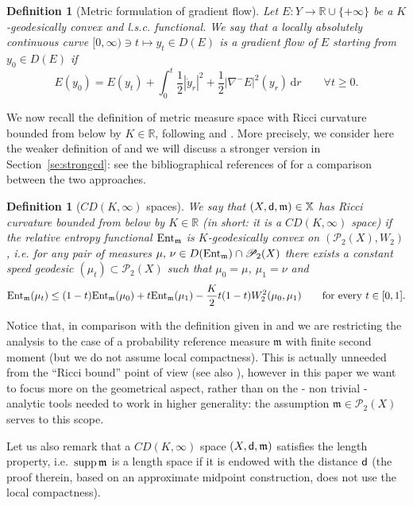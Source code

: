 \documentclass[reqno,11pt]{article}
\numberwithin{equation}{section}
\newcommand{\R}{\mathbb{R}}
\newcommand{\mm}{{\mbox{\boldmath$m$}}}
\newcommand{\sfd}{{\sf d}}
\newcommand{\supp}{\mathop{\rm supp}\nolimits}   %
\renewcommand{\d}{{\mathrm d}}
\newcommand{\forevery}{\text{for every }}
\newcommand{\ProbabilitiesTwo}[1]{\mathscr P_2(#1)}     %
\newtheorem{definition}[theorem]{Definition}
\newcommand{\entv}{{\rm Ent}_{\mm}}                    %
\newcommand{\probt}{\ProbabilitiesTwo}
\newcommand{\X}{\mathbb X}
\newcommand{\entr}[2]{{\rm Ent}_{#2}(#1)}              %
\renewcommand{\mm}{\mathfrak m}
\begin{document}
\begin{definition}[Metric  formulation of gradient flow]\label{def:dissKconv}
Let $E:Y\to\R\cup\{+\infty\}$ be a $K$-geodesically convex and
l.s.c. functional. We say that a locally absolutely continuous curve
$[0,\infty)\ni t\mapsto y_t\in D(E)$ is a gradient flow of $E$
starting from $y_0\in D(E)$ if
\begin{equation}\label{eq:ede}
E(y_0)= E(y_t)+\int_0^t\frac12 |\dot y_r|^2+\frac12|\nabla^-
E|^2(y_r)\,\d r\qquad\forall t\geq 0.
\end{equation}
\end{definition}
%
We now recall the definition of metric measure space with Ricci
curvature bounded from below by $K\in\R$, following \cite[\S
4.2]{Sturm06I} and \cite[\S 5]{Lott-Villani09}. More precisely, we
consider here the weaker definition of \cite{Sturm06I} and we will
discuss a stronger version in Section~\ref{se:strongcd}: see the
bibliographical references of \cite[Chapter 17]{Villani09} for a
comparison between the two approaches.
%
\begin{definition}[$CD(K,\infty)$ spaces]\label{def:cdk}
We say that $(X,\sfd,\mm)\in\X$ has Ricci curvature bounded from
below by $K\in\R$ (in short: it is a $CD(K,\infty)$ space) if the
relative entropy functional $\entv$ is $K$-geodesically convex on
$(\probt X,W_2)$, i.e. for any pair of measures $\mu,\,\nu\in
D(\entv)\cap\probt X$ there exists a constant speed geodesic
$(\mu_t)\subset\probt X$ such that $\mu_0=\mu$, $\mu_1=\nu$ and
\[
\entr{\mu_t}\mm\leq(1-t)\entr{\mu_0}\mm+t\entr{\mu_1}\mm-\frac
K2t(1-t)W_2^2(\mu_0,\mu_1)\qquad\forevery t\in[0,1].
\]
\end{definition}
%
Notice that, in comparison with the definition given in
\cite{Sturm06I} and \cite{Lott-Villani09} we are restricting the
analysis to the case of a probability reference measure  $\mm$ with
finite second moment (but we do not assume local compactness). This
is actually unneeded from the ``Ricci bound'' point of view (see
also \cite[Definition~9.1]{Ambrosio-Gigli-Savare11}), however in
this paper we want to focus more on the geometrical aspect, rather
than on the - non trivial - analytic tools needed to work in higher
generality: the assumption $\mm\in\probt X$ serves to this scope.

Let us also remark that a $CD(K,\infty)$ space $(X,\sfd,\mm)$
satisfies the length property, i.e.~$\supp\mm$ is a length space if
it is endowed with the distance $\sfd$ \cite[Remark
4.6(iii)]{Sturm06I} (the proof therein, based on an approximate
midpoint construction, does not use the local compactness).
\end{document}
